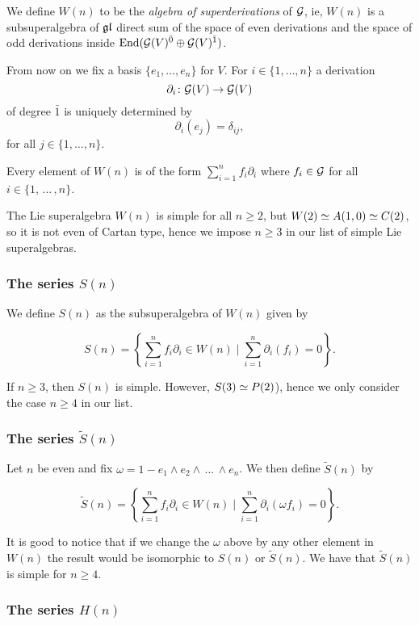 We define $W(n)$ to be the \emph{algebra of superderivations} of $\mathcal G$, ie, $W(n)$ is a subsuperalgebra of $\mathfrak{gl} $ direct sum of the space of even derivations and the space of odd derivations inside $\operatorname{End}(\mathcal G(V)^{\bar0}\oplus\mathcal G(V)^{\bar1})$.

From now on we fix a basis $\{e_1,\ldots,e_n\}$ for $V$. For $i\in \{1,\ldots ,n\}$ a derivation \[\partial_i \colon \mathcal G(V) \rightarrow \mathcal G(V)\] of degree $\bar 1$ is uniquely determined by \[\partial_i (e_j) =  \delta_{ij},\] for all $j\in \{1,\ldots ,n\}.$

Every element of $W(n)$ is of the form $\sum_{i=1}^{n} f_i \partial_i$ where $f_i \in \mathcal G$ for all $i\in\{1,\, ...\, ,n\}$.

The Lie superalgebra $W(n)$ is simple for all $n\geq 2$, but $W(2)\simeq A(1,0)\simeq C(2)$, so it is not even of Cartan type, hence we impose $n\geq 3$ in our list of simple Lie superalgebras.

\subsubsection{The series $S(n)$}

We define $S(n)$ as the subsuperalgebra of $W(n)$ given by 

\[
S(n) = \left\{ \sum_{i=1}^{n} f_i \partial_i \in W(n) \mid 
\sum_{i=1}^{n} \partial_i (f_i) =0
\right\}.
\]

If $n\geq 3$, then $S(n)$ is simple. However, $S(3)\simeq P(2)$), hence we only consider the case $n\geq 4$ in our list.

\subsubsection{The series $\tilde S(n)$}

Let $n$ be even and fix $\omega = 1 - e_1\wedge e_2\wedge \, ...\, \wedge e_n$. We then define $\tilde S(n)$ by

\[
\tilde S(n) = \left\{ \sum_{i=1}^{n} f_i \partial_i \in W(n) \mid 
\sum_{i=1}^{n} \partial_i (\omega f_i) =0
\right\}.
\]

It is good to notice that if we change the $\omega$ above by any other element in $W(n)$ the result would be isomorphic to $S(n)$ or $\tilde S(n)$.
    We have that $\tilde S(n)$ is simple for $n\geq 4$.

\subsubsection{The series $H(n)$}

